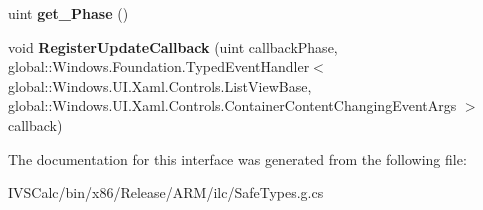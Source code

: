 \begin{DoxyCompactItemize}
\mbox{\label{interface_windows_1_1_u_i_1_1_xaml_1_1_controls_1_1_i_container_content_changing_event_args_a738ad9fa4dbda62eecb572e7177f20c5}} 
uint {\bfseries get\+\_\+\+Phase} ()
\item 
\mbox{\label{interface_windows_1_1_u_i_1_1_xaml_1_1_controls_1_1_i_container_content_changing_event_args_a667cd37ef9c242308e80a5eeb302226a}} 
void {\bfseries Register\+Update\+Callback} (uint callback\+Phase, global\+::\+Windows.\+Foundation.\+Typed\+Event\+Handler$<$ global\+::\+Windows.\+U\+I.\+Xaml.\+Controls.\+List\+View\+Base, global\+::\+Windows.\+U\+I.\+Xaml.\+Controls.\+Container\+Content\+Changing\+Event\+Args $>$ callback)
\end{DoxyCompactItemize}


The documentation for this interface was generated from the following file\+:\begin{DoxyCompactItemize}
\item 
I\+V\+S\+Calc/bin/x86/\+Release/\+A\+R\+M/ilc/Safe\+Types.\+g.\+cs\end{DoxyCompactItemize}
